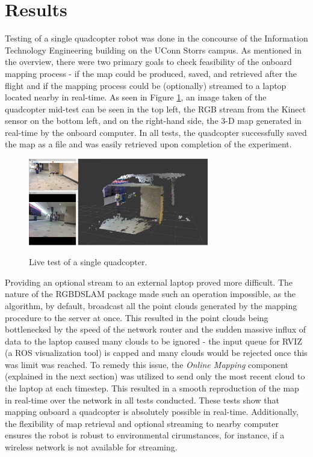 \documentclass[letterpaper, oneside, 10pt]{report}
\begin{document}
\section{Results}
Testing of a single quadcopter robot was done in the concourse of the Information Technology Engineering building on the UConn Storrs campus. As mentioned in the overview, there were two primary goals to check feasibility of the onboard mapping process - if the map could be produced, saved, and retrieved after the flight and if the mapping process could be (optionally) streamed to a laptop located nearby in real-time. As seen in Figure \ref{fig: single test.}, an image taken of the quadcopter mid-test can be seen in the top left, the RGB stream from the Kinect sensor on the bottom left, and on the right-hand side, the 3-D map generated in real-time by the onboard computer. In all tests, the quadcopter successfully saved the map as a file and was easily retrieved upon completion of the experiment.

\begin{figure}[h]
 \caption{Live test of a single quadcopter.}
 \centering
   \includegraphics[width=0.7\textwidth]{images/single_test}
 \label{fig: single test.}
\end{figure}

\noindent Providing an optional stream to an external laptop proved more difficult. The nature of the RGBDSLAM package made such an operation impossible, as the algorithm, by default, broadcast all the point clouds generated by the mapping procedure to the server at once. This resulted in the point clouds being bottlenecked by the speed of the network router and the sudden massive influx of data to the laptop caused many clouds to be ignored - the input queue for RVIZ (a ROS visualization tool) is capped and many clouds would be rejected once this was limit was reached. To remedy this issue, the \textsl{Online Mapping} component (explained in the next section) was utilized to send only the most recent cloud to the laptop at each timestep. This resulted in a smooth reproduction of the map in real-time over the network in all tests conducted. These tests show that mapping onboard a quadcopter is absolutely possible in real-time. Additionally, the flexibility of map retrieval and optional streaming to nearby computer ensures the robot is robust to environmental cirumstances, for instance, if a wireless network is not available for streaming.
\end{document}
